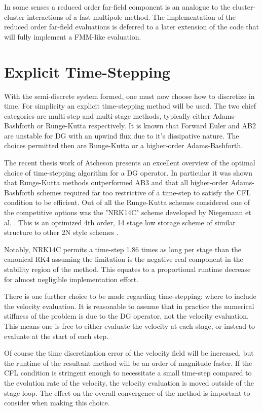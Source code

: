 \documentclass[letterpaper,12pt]{report}
\begin{document}
In some senses a reduced order far-field component is an analogue to the cluster-cluster interactions of a fast multipole method. The implementation of the reduced order far-field evaluations is deferred to a later extension of the code that will fully implement a FMM-like evaluation.
%
\section{Explicit Time-Stepping}
With the semi-discrete system formed, one must now choose how to discretize in time. For simplicity an explicit time-stepping method will be used. The two chief categories are multi-step and multi-stage methods, typically either Adams-Bashforth or Runge-Kutta respectively. It is known that Forward Euler and AB2 are unstable for DG with an upwind flux due to it's dissipative nature. The choices permitted then are Runge-Kutta or a higher-order Adams-Bashforth.

The recent thesis work of Atcheson \cite{Reid} presents an excellent overview of the optimal choice of time-stepping algorithm for a DG operator. In particular it was shown that Runge-Kutta methods outperformed AB3 and that all higher-order Adams-Bashforth schemes required far too restrictive of a time-step to satisfy the CFL condition to be efficient. Out of all the Runge-Kutta schemes considered \cite{Toulorge} one of the competitive options was the "NRK14C" scheme developed by Niegemann et al. \cite{Niegemann}. This is an optimized 4th order, 14 stage low storage scheme of similar structure to other 2N style schemes \cite{Carpenter}.

Notably, NRK14C permits a time-step 1.86 times as long per stage than the canonical RK4 assuming the limitation is the negative real component in the stability region of the method. This equates to a proportional runtime decrease for almost negligible implementation effort. 

There is one further choice to be made regarding time-stepping: where to include the velocity evaluation. It is reasonable to assume that in practice the numerical stiffness of the problem is due to the DG operator, not the velocity evaluation. This means one is free to either evaluate the velocity at each stage, or instead to evaluate at the start of each step. 

Of course the time discretization error of the velocity field will be increased, but the runtime of the resultant method will be an order of magnitude faster. If the CFL condition is stringent enough to necessitate a small time-step compared to the evolution rate of the velocity, the velocity evaluation is moved outside of the stage loop. The effect on the overall convergence of the method is important to consider when making this choice.
\end{document}
